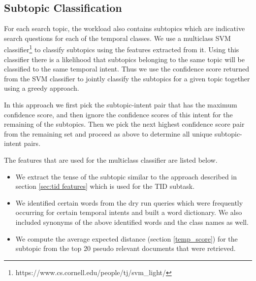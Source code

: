 \documentclass{sig-alternate}
\begin{document}
\subsection{Subtopic Classification}\label{subtopic_classify}
For each search topic, the workload also contains subtopics which are indicative search questions for each of the temporal classes. We use a multiclass SVM classifier\footnote{https://www.cs.cornell.edu/people/tj/svm\_light/} to classify subtopics using the features extracted from it. Using this classifier there is a likelihood that subtopics belonging to the same topic will be classified to the same temporal intent. Thus we use the confidence score returned from the SVM classifier to jointly classify the subtopics for a given topic together using a greedy approach.

In this approach we first pick the subtopic-intent pair that has the maximum confidence score, and then ignore the confidence scores of this intent for the remaining of the subtopics. Then we pick the next highest confidence score pair from the remaining set and proceed as above to determine all unique subtopic-intent pairs.

The features that are used for the multiclass classifier are listed below.
\begin{itemize}
\item We extract the tense of the subtopic similar to the approach described in section \ref{sec:tid features} which is used for the TID subtask. 
\item We identified certain words from the dry run queries which were frequently occurring for certain temporal intents and built a word dictionary. We also included synonyms of the above identified words and the class names as well.
\item We compute the average expected distance (section \ref{temp_score}) for the subtopic from the top 20 pseudo relevant documents that were retrieved. 
\end{itemize}
\end{document}
